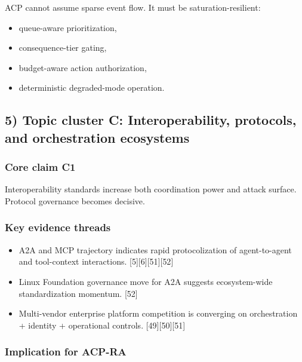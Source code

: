 \documentclass[11pt]{article}
\begin{document}
ACP cannot assume sparse event flow. It must be saturation-resilient:

\begin{itemize}
\tightlist
\item
  queue-aware prioritization,
\item
  consequence-tier gating,
\item
  budget-aware action authorization,
\item
  deterministic degraded-mode operation.
\end{itemize}

\hypertarget{topic-cluster-c-interoperability-protocols-and-orchestration-ecosystems}{%
\subsection{5) Topic cluster C: Interoperability, protocols, and
orchestration
ecosystems}\label{topic-cluster-c-interoperability-protocols-and-orchestration-ecosystems}}

\hypertarget{core-claim-c1}{%
\subsubsection{Core claim C1}\label{core-claim-c1}}

Interoperability standards increase both coordination power and attack
surface. Protocol governance becomes decisive.

\hypertarget{key-evidence-threads-2}{%
\subsubsection{Key evidence threads}\label{key-evidence-threads-2}}

\begin{itemize}
\tightlist
\item
  A2A and MCP trajectory indicates rapid protocolization of
  agent-to-agent and tool-context interactions.
  {[}5{]}{[}6{]}{[}51{]}{[}52{]}
\item
  Linux Foundation governance move for A2A suggests ecosystem-wide
  standardization momentum. {[}52{]}
\item
  Multi-vendor enterprise platform competition is converging on
  orchestration + identity + operational controls.
  {[}49{]}{[}50{]}{[}51{]}
\end{itemize}

\hypertarget{implication-for-acp-ra-2}{%
\subsubsection{Implication for ACP-RA}\label{implication-for-acp-ra-2}}
\end{document}
